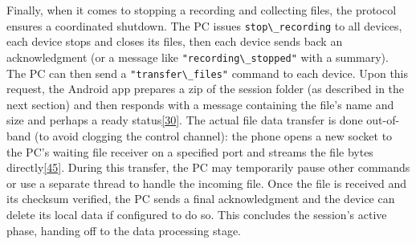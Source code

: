 \documentclass[12pt,a4paper]{article}
\begin{document}
Finally, when it comes to stopping a recording and collecting files, the protocol ensures a coordinated shutdown. The PC issues \passthrough{\lstinline!stop\_recording!} to all devices, each device stops and closes its files, then each device sends back an acknowledgment (or a message like \passthrough{\lstinline!"recording\_stopped"!} with a summary). The PC can then send a \passthrough{\lstinline!"transfer\_files"!} command to each device. Upon this request, the Android app prepares a zip of the session folder (as described in the next section) and then responds with a message containing the file's name and size and perhaps a ready status\href{https://github.com/buccancs/GSR-Dual-Video-System/blob/05ae360cb7b4ae7c7861f72deb235ad64a74b38e/pc_controller/src/main/main.py\#L74-L81}{{[}30{]}}. The actual file data transfer is done out-of-band (to avoid clogging the control channel): the phone opens a new socket to the PC's waiting file receiver on a specified port and streams the file bytes directly\href{https://github.com/buccancs/GSR-Dual-Video-System/blob/05ae360cb7b4ae7c7861f72deb235ad64a74b38e/android/app/src/main/java/com/yourcompany/gsrcapture/manager/FileTransferManager.kt\#L50-L58}{{[}45{]}}. During this transfer, the PC may temporarily pause other commands or use a separate thread to handle the incoming file. Once the file is received and its checksum verified, the PC sends a final acknowledgment and the device can delete its local data if configured to do so. This concludes the session's active phase, handing off to the data processing stage.
\end{document}
